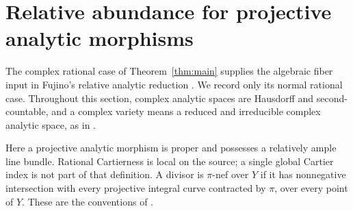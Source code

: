 \section{Relative abundance for projective analytic morphisms}
\label{sec:analytic-abundance}

The complex rational case of Theorem~\ref{thm:main} supplies the algebraic
fiber input in Fujino's relative analytic reduction
\cite[Theorem~1.10 and its proof]{FujinoRelativeAnalytic2025}.
We record only its normal rational case. Throughout this section, complex
analytic spaces are Hausdorff and second-countable, and a complex variety
means a reduced and irreducible complex analytic space, as in
\cite[p.~5]{FujinoRelativeAnalytic2025}.

Here a projective analytic morphism is proper and possesses a relatively
ample line bundle. Rational Cartierness is local on the source; a single
global Cartier index is not part of that definition. A divisor is
\(\pi\)-nef over \(Y\) if it has nonnegative intersection with every
projective integral curve contracted by \(\pi\), over every point of \(Y\).
These are the conventions of
\cite[Definitions~2.28, 2.32 and~2.48]{FujinoAnalyticMMP2022}.

